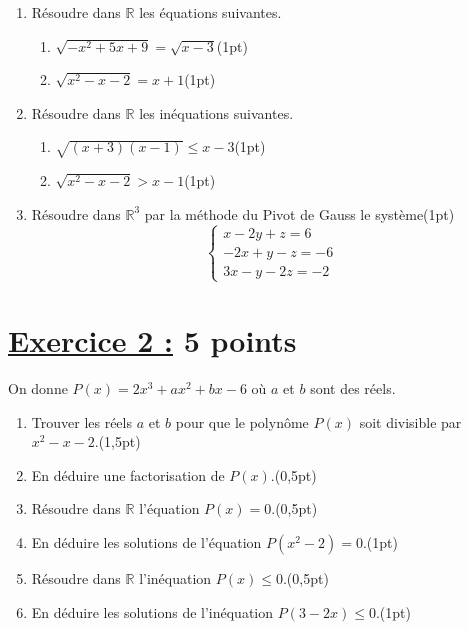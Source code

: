 \documentclass[12pt,a4paper]{article}
\begin{document}
\begin{enumerate}
    \item Résoudre dans $\mathbb{R}$ les équations suivantes.
    \begin{enumerate}
        \item $\sqrt{-x^2 + 5x + 9} = \sqrt{x - 3}$\hfill (1pt)
        \item $\sqrt{x^2 - x - 2} = x + 1$\hfill (1pt)
    \end{enumerate}
    
    \item Résoudre dans $\mathbb{R}$ les inéquations suivantes.
    \begin{enumerate}
        \item $\sqrt{(x + 3)(x - 1)} \leq x - 3$\hfill (1pt)
        \item $\sqrt{x^{2}-x-2} > x-1 $\hfill (1pt)
    \end{enumerate}
    
    \item Résoudre dans $\mathbb{R}^3$ par la méthode du Pivot de Gauss le système\hfill (1pt)
    \[
    \begin{cases}
        x - 2y + z = 6 \\
        -2x + y - z = -6 \\
        3x - y - 2z = -2
    \end{cases}
    \]
\end{enumerate}
\section*{\underline{Exercice 2 :} 5 points}

On donne \( P(x) = 2x^3 + ax^2 + bx - 6 \) où \( a \) et \( b \) sont des réels.
\begin{enumerate}
    \item Trouver les réels \( a \) et \( b \) pour que le polynôme \( P(x) \) soit divisible par \( x^2 - x - 2 \).\hfill (1,5pt)
    \item En déduire une factorisation de \( P(x) \).\hfill (0,5pt)
    \item Résoudre dans \( \mathbb{R} \) l'équation \( P(x) = 0 \).\hfill (0,5pt)
    \item En déduire les solutions de l'équation \( P(x^2 - 2) = 0 \).\hfill (1pt)
    \item Résoudre dans \( \mathbb{R} \) l'inéquation \( P(x) \leq 0 \).\hfill (0,5pt)
    \item En déduire les solutions de l'inéquation \( P(3 - 2x) \leq 0 \).\hfill (1pt)
\end{enumerate}
\end{document}
